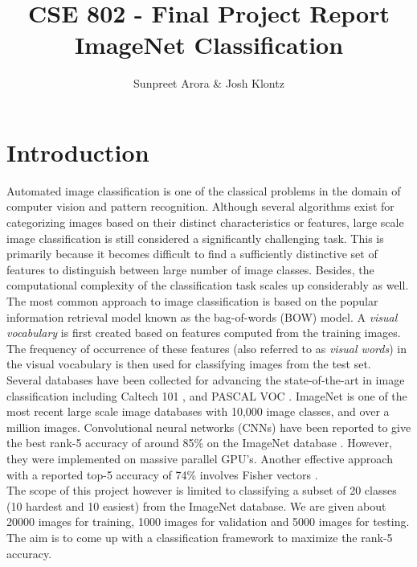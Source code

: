 \documentclass[12pt]{article}
\begin{document}
 
\title{CSE 802 - Final Project Report\\ ImageNet Classification}
\author{Sunpreet Arora \& Josh Klontz\\
}
 
\maketitle

\section{Introduction}
Automated image classification is one of the classical problems in the domain of computer vision and pattern recognition. Although several algorithms exist for categorizing images based on their distinct characteristics or features, large scale image classification is still considered a significantly challenging task. This is primarily because it becomes difficult to find a sufficiently distinctive set of features to distinguish between large number of image classes. Besides, the computational complexity of the classification task scales up considerably as well.\\
The most common approach to image classification is based on the popular information retrieval model known as the bag-of-words (BOW) model. A \textit{visual vocabulary} is first created based on features computed from the training images. The frequency of occurrence of these features (also referred to as \textit{visual words}) in the visual vocabulary is then used for classifying images from the test set.\\
Several databases have been collected for advancing the state-of-the-art in image classification including Caltech 101 \cite{caltech101}, and PASCAL VOC \cite{pascal09}. ImageNet \cite{imagenet} is one of the most recent large scale image databases with 10,000 image classes, and over a million images. Convolutional neural networks (CNNs) have been reported to give the best rank-5 accuracy of around 85\% on the ImageNet database \cite{alex2012}. However, they were implemented on massive parallel GPU's. Another effective approach with a reported top-5 accuracy of 74\% involves Fisher vectors \cite{csurka2011fisher}.\\
The scope of this project however is limited to classifying a subset of 20 classes (10 hardest and 10 easiest) from the ImageNet database. We are given about 20000 images for training, 1000 images for validation and 5000 images for testing. The aim is to come up with a classification framework to maximize the rank-5 accuracy.
\end{document}
